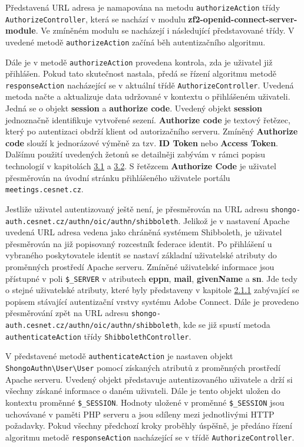 \documentclass[
  printed, %
  twoside, %
  table,   %
  nolof,     %
  nolot,     %
]{fithesis3}
\begin{document}
Představená URL adresa je namapována na metodu \texttt{authorizeAction} třídy \texttt{AuthorizeController}, která se nachází v modulu \textbf{zf2-openid-connect-server-module}. Ve zmíněném modulu  se nacházejí i následující představované třídy. V uvedené metodě \texttt{authorizeAction} začíná běh autentizačního algoritmu. \par 

Dále je v metodě \texttt{authorizeAction} provedena kontrola, zda je uživatel již přihlášen. Pokud tato skutečnost nastala, předá se řízení algoritmu metodě \texttt{responseAction} nacházející se v aktuální třídě \texttt{AuthorizeController}. Uvedená metoda načte a aktualizuje data udržované v kontextu o přihlášeném uživateli. Jedná se o objekt \textbf{session} a \textbf{authorize code}. Uvedený objekt \textbf{session} jednoznačně identifikuje vytvořené sezení. \textbf{Authorize code} je textový řetězec, který po autentizaci obdrží klient od autorizačního serveru. Zmíněný \textbf{Authorize code} slouží k jednorázové výměně za tzv. \textbf{ID Token} nebo \textbf{Access Token}. Dalšímu použití uvedených žetonů se detailněji zabývám v rámci popisu technologií v kapitolách \hyperref[sec:oauth]{3.1} a \hyperref[sec:oidc]{3.2}. S řetězcem \textbf{Authorize Code} je uživatel přesměrován na úvodní stránku přihlášeného uživatele portálu \texttt{meetings.cesnet.cz}. \par 

Jestliže uživatel autentizovaný ještě není, je přesměrován na URL adresu \texttt{shongo-auth.cesnet.cz/authn/oic/authn/shibboleth}. Jelikož je v nastavení Apache uvedená URL adresa vedena jako chráněná systémem Shibboleth, je uživatel přesměrován na již popisovaný rozcestník federace identit. Po přihlášení u vybraného poskytovatele identit se nastaví základní uživatelské atributy do proměnných prostředí Apache serveru. Zmíněné uživatelské informace jsou přístupné v poli \texttt{\$\_SERVER} v atributech \textbf{eppn}, \textbf{mail}, \textbf{givenName} a \textbf{sn}. Jde tedy o stejné uživatelské atributy, které byly představeny v kapitole \hyperref[item:adobe-connect]{2.1.1} zabývající se popisem stávající autentizační vrstvy systému Adobe Connect. Dále je provedeno přesměrování zpět na URL adresu \texttt{shongo-auth.cesnet.cz/authn/oic/authn/shibboleth}, kde se již spustí metoda \texttt{authenticateAction} třídy \texttt{ShibbolethController}. \par

V představené metodě \texttt{authenticateAction} je nastaven objekt \texttt{ShongoAuthn\textbackslash User\textbackslash User} pomocí získaných atributů z proměnných prostředí Apache serveru. Uvedený objekt představuje autentizovaného uživatele a drží si všechny získané informace o daném uživateli. Dále je tento objekt uložen do kontextu proměnné \texttt{\$\_SESSION}. Hodnoty uložené v proměnné \texttt{\$\_SESSION} jsou uchovávané v paměti PHP serveru a jsou sdíleny mezi jednotlivými HTTP požadavky. Pokud všechny předchozí kroky proběhly úspěšně, je předáno řízení algoritmu metodě \texttt{responseAction} nacházející se v třídě \texttt{AuthorizeController}. \par
\end{document}
